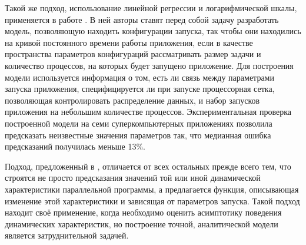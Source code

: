 		Такой же подход, использование линейной регрессии и логарифмической шкалы, применяется в работе \cite{focused_regression}. В ней авторы ставят перед собой задачу разработать модель, позволяющую находить конфигурации запуска, так чтобы они находились на кривой постоянного времени работы приложения, если в качестве пространства параметров конфигураций рассматривать размер задачи и количество процессов, на которых будет запущено приложение. Для построения модели используется информация о том, есть ли связь между параметрами запуска приложения, специфицируется ли при запуске процессорная сетка, позволяющая контролировать распределение данных, и набор запусков приложения на небольшим количестве процессов. Экспериментальная проверка построенной модели на семи суперкомпьютерных приложениях позволила предсказать неизвестные значения параметров так, что медианная ошибка предсказаний получилась меньше 13\%.

		Подход, предложенный в \cite{analytic_func}, отличается от всех остальных прежде всего тем, что строятся не просто предсказания значений той или иной динамической характеристики параллельной программы, а предлагается функция, описывающая изменение этой характеристики и зависящая от параметров запуска. Такой подход находит своё применение, когда необходимо оценить асимптотику поведения динамических характеристик, но построение точной, аналитической модели является затруднительной задачей.
			

